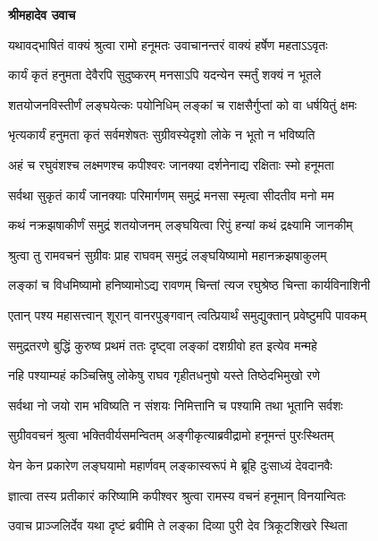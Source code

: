 


\textbf{श्रीमहादेव उवाच}

\twolineshloka
{यथावद्भाषितं वाक्यं श्रुत्वा रामो हनूमतः}
{उवाचानन्तरं वाक्यं हर्षेण महताऽऽवृतः} %

\twolineshloka
{कार्यं कृतं हनुमता देवैरपि सुदुष्करम्}
{मनसाऽपि यदन्येन स्मर्तुं शक्यं न भूतले} %

\twolineshloka
{शतयोजनविस्तीर्णं लङ्घयेत्कः पयोनिधिम्}
{लङ्कां च राक्षसैर्गुप्तां को वा धर्षयितुं क्षमः} %

\twolineshloka
{भृत्यकार्यं हनुमता कृतं सर्वमशेषतः}
{सुग्रीवस्येदृशो लोके न भूतो न भविष्यति} %

\twolineshloka
{अहं च रघुवंशश्च लक्ष्मणश्च कपीश्वरः}
{जानक्या दर्शनेनाद्य रक्षिताः स्मो हनूमता} %

\twolineshloka
{सर्वथा सुकृतं कार्यं जानक्याः परिमार्गणम्}
{समुद्रं मनसा स्मृत्वा सीदतीव मनो मम} %

\twolineshloka
{कथं नक्रझषाकीर्णं समुद्रं शतयोजनम्}
{लङ्घयित्वा रिपुं हन्यां कथं द्रक्ष्यामि जानकीम्} %

\twolineshloka
{श्रुत्वा तु रामवचनं सुग्रीवः प्राह राघवम्}
{समुद्रं लङ्घयिष्यामो महानक्रझषाकुलम्} %

\twolineshloka
{लङ्कां च विधमिष्यामो हनिष्यामोऽद्य रावणम्}
{चिन्तां त्यज रघुश्रेष्ठ चिन्ता कार्यविनाशिनी} %

\twolineshloka
{एतान् पश्य महासत्त्वान् शूरान् वानरपुङ्गवान्}
{त्वत्प्रियार्थं समुद्युक्तान् प्रवेष्टुमपि पावकम्} %

\twolineshloka
{समुद्रतरणे बुद्धिं कुरुष्व प्रथमं ततः}
{दृष्ट्वा लङ्कां दशग्रीवो हत इत्येव मन्महे} %

\twolineshloka
{नहि पश्याम्यहं कञ्चित्त्रिषु लोकेषु राघव}
{गृहीतधनुषो यस्ते तिष्ठेदभिमुखो रणे} %

\twolineshloka
{सर्वथा नो जयो राम भविष्यति न संशयः}
{निमित्तानि च पश्यामि तथा भूतानि सर्वशः} %

\twolineshloka
{सुग्रीववचनं श्रुत्वा भक्तिवीर्यसमन्वितम्}
{अङ्गीकृत्याब्रवीद्रामो हनूमन्तं पुरःस्थितम्} %

\twolineshloka
{येन केन प्रकारेण लङ्घयामो महार्णवम्}
{लङ्कास्वरूपं मे ब्रूहि दुःसाध्यं देवदानवैः} %

\twolineshloka
{ज्ञात्वा तस्य प्रतीकारं करिष्यामि कपीश्वर}
{श्रुत्वा रामस्य वचनं हनूमान् विनयान्वितः} %

\twolineshloka
{उवाच प्राञ्जलिर्देव यथा दृष्टं ब्रवीमि ते}
{लङ्का दिव्या पुरी देव त्रिकूटशिखरे स्थिता} %

